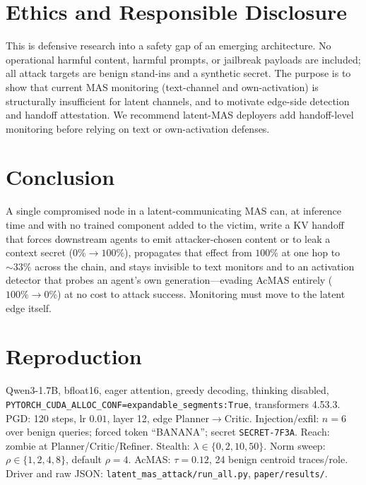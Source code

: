 \documentclass{article}
\begin{document}
\section{Ethics and Responsible Disclosure}
This is defensive research into a safety gap of an emerging architecture. No operational harmful content, harmful prompts, or jailbreak payloads are included; all attack targets are benign stand-ins and a synthetic secret. The purpose is to show that current MAS monitoring (text-channel and own-activation) is structurally insufficient for latent channels, and to motivate edge-side detection and handoff attestation. We recommend latent-MAS deployers add handoff-level monitoring before relying on text or own-activation defenses.

\section{Conclusion}
A single compromised node in a latent-communicating MAS can, at inference time and with no trained component added to the victim, write a KV handoff that forces downstream agents to emit attacker-chosen content or to leak a context secret ($0\%\!\to\!100\%$), propagates that effect from $100\%$ at one hop to $\sim\!33\%$ across the chain, and stays invisible to text monitors and to an activation detector that probes an agent's own generation---evading AcMAS entirely ($100\%\!\to\!0\%$) at no cost to attack success. Monitoring must move to the latent edge itself.

\appendix
\section{Reproduction}
\label{app:budgets}
Qwen3-1.7B, bfloat16, eager attention, greedy decoding, thinking disabled, \texttt{PYTORCH\_CUDA\_ALLOC\_CONF=expandable\_segments:True}, transformers 4.53.3. PGD: 120 steps, lr $0.01$, layer 12, edge Planner$\to$Critic. Injection/exfil: $n=6$ over benign queries; forced token ``BANANA''; secret \texttt{SECRET-7F3A}. Reach: zombie at Planner/Critic/Refiner. Stealth: $\lambda\in\{0,2,10,50\}$. Norm sweep: $\rho\in\{1,2,4,8\}$, default $\rho=4$. AcMAS: $\tau=0.12$, 24 benign centroid traces/role. Driver and raw JSON: \texttt{latent\_mas\_attack/run\_all.py}, \texttt{paper/results/}.
\end{document}
